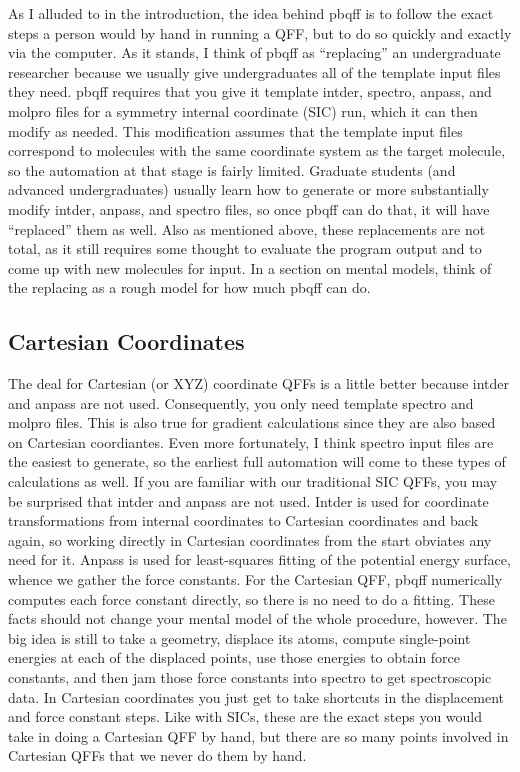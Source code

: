 \documentclass{article}
\begin{document}
As I alluded to in the introduction, the idea behind pbqff is to
follow the exact steps a person would by hand in running a QFF, but to
do so quickly and exactly via the computer. As it stands, I think of
pbqff as ``replacing'' an undergraduate researcher because we usually
give undergraduates all of the template input files they need. pbqff
requires that you give it template intder, spectro, anpass, and molpro
files for a symmetry internal coordinate (SIC) run, which it can then
modify as needed. This modification assumes that the template input
files correspond to molecules with the same coordinate system as the
target molecule, so the automation at that stage is fairly
limited. Graduate students (and advanced undergraduates) usually learn
how to generate or more substantially modify intder, anpass, and
spectro files, so once pbqff can do that, it will have ``replaced''
them as well. Also as mentioned above, these replacements are not
total, as it still requires some thought to evaluate the program
output and to come up with new molecules for input. In a section on
mental models, think of the replacing as a rough model for how much
pbqff can do.

\subsection{Cartesian Coordinates}

The deal for Cartesian (or XYZ) coordinate QFFs is a little better
because intder and anpass are not used. Consequently, you only need
template spectro and molpro files. This is also true for gradient
calculations since they are also based on Cartesian coordiantes. Even
more fortunately, I think spectro input files are the easiest to
generate, so the earliest full automation will come to these types of
calculations as well. If you are familiar with our traditional SIC
QFFs, you may be surprised that intder and anpass are not used. Intder
is used for coordinate transformations from internal coordinates to
Cartesian coordinates and back again, so working directly in Cartesian
coordinates from the start obviates any need for it. Anpass is used
for least-squares fitting of the potential energy surface, whence we
gather the force constants. For the Cartesian QFF, pbqff numerically
computes each force constant directly, so there is no need to do a
fitting. These facts should not change your mental model of the whole
procedure, however. The big idea is still to take a geometry, displace
its atoms, compute single-point energies at each of the displaced
points, use those energies to obtain force constants, and then jam
those force constants into spectro to get spectroscopic data. In
Cartesian coordinates you just get to take shortcuts in the
displacement and force constant steps. Like with SICs, these are the
exact steps you would take in doing a Cartesian QFF by hand, but there
are so many points involved in Cartesian QFFs that we never do them by
hand.
\end{document}
